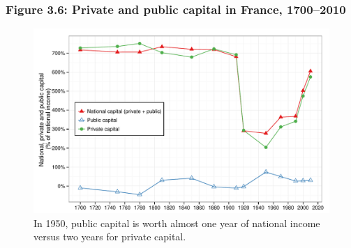 \documentclass[t]{beamer}\usepackage[]{graphicx}\usepackage[]{color}
\newenvironment{knitrout}{}{} %
\begin{document}
\begin{frame}[label=Figure_3_6]
\frametitle{Figure 3.6: Private and public capital in France, 1700--2010}
\begin{figure}[t]
\begin{minipage}[b]{\textwidth}
\centering
\begin{knitrout}\footnotesize
{}\color{fgcolor}

{\centering \includegraphics[width=1\linewidth]{figures/color/Figure_3_6} 

}



\end{knitrout}
\caption{In 1950, public capital is worth almost one year of national income versus two years for private capital.}
\end{minipage}
\end{figure}
\end{frame}
\end{document}

